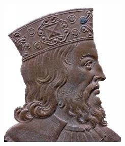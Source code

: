 \documentclass{article}
\begin{document}
\hfill
\noindent\begin{minipage}{0.3\textwidth}
    \includegraphics[width=\linewidth]{chlodvik.jpg}
\end{minipage}
\end{document}
